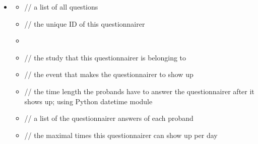 \documentclass[a4paper]{scrreprt}
\begin{document}
\begin{itemize}
                    \item {}
                        \begin{itemize}
                            \item {}
                                \par // a list of all questions
                            \item {}
                                \par // the unique ID of this questionnairer
                            \item {}
                            \item {}
                                \par // the study that this questionnairer is belonging to
                            \item {}
                                \par // the event that makes the questionnairer to show up
                            \item {}
                                \par // the time length the probands have to answer the questionnairer after it shows up; using Python datetime module
                            \item {}
                                \par // a list of the questionnairer answers of each proband
                            \item {}
                                \par // the maximal times this questionnairer can show up per day
                        \end{itemize}
                        

\end{itemize}
\end{document}
